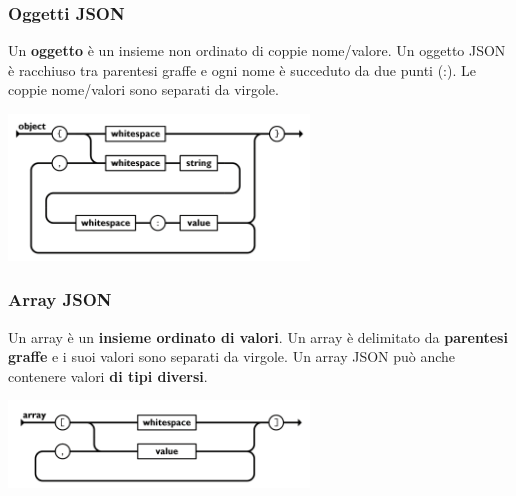\documentclass[12pt]{article}
\begin{document}
\subsubsection{Oggetti JSON}
Un \textbf{oggetto} è un insieme non ordinato di coppie nome/valore.
Un oggetto JSON è racchiuso tra parentesi graffe e ogni nome è succeduto da due punti (:).
Le coppie nome/valori sono separati da virgole.
\begin{center}
    \includegraphics[width = 0.60\textwidth]{Images/171.png}
\end{center}
\subsubsection{Array JSON}
Un array è un \textbf{insieme ordinato di valori}. Un array è delimitato da \textbf{parentesi graffe} e i suoi valori sono separati da virgole.
Un array JSON può anche contenere valori \textbf{di tipi diversi}.
\begin{center}
    \includegraphics[width = 0.60\textwidth]{Images/172.png}
\end{center}
\end{document}
